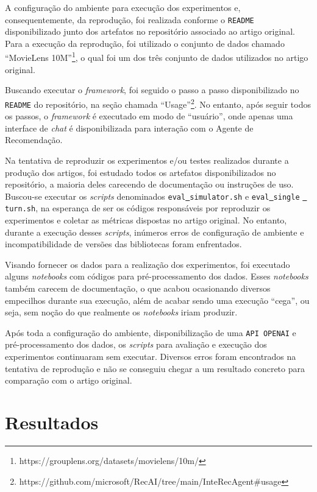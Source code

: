 \documentclass{article}
\begin{document}
A configuração do ambiente para execução dos experimentos e, consequentemente, da reprodução, foi realizada conforme o \texttt{README} disponibilizado junto dos artefatos no repositório associado ao artigo original. Para a execução da reprodução, foi utilizado o conjunto de dados chamado “MovieLens 10M”\footnote{https://grouplens.org/datasets/movielens/10m/}, o qual foi um dos três conjunto de dados utilizados no artigo original. 

Buscando executar o \textit{framework}, foi seguido o passo a passo disponibilizado no \texttt{README} do repositório, na seção chamada “Usage”\footnote{https://github.com/microsoft/RecAI/tree/main/InteRecAgent\#usage}. No entanto, após seguir todos os passos, o \textit{framework} é executado em modo de “usuário”, onde apenas uma interface de \textit{chat} é disponibilizada para interação com o Agente de Recomendação. 

Na tentativa de reproduzir os experimentos e/ou testes realizados durante a produção dos artigos, foi estudado todos os artefatos disponibilizados no repositório, a maioria deles carecendo de documentação ou instruções de uso. Buscou-se executar os \textit{scripts} denominados \texttt{eval\underline{ }simulator.sh} e \texttt{eval\underline{ }single} \texttt{\underline{ }turn.sh}, na esperança de ser os códigos responsáveis por reproduzir os experimentos e coletar as métricas dispostas no artigo original. No entanto, durante a execução desses \textit{scripts}, inúmeros erros de configuração de ambiente e incompatibilidade de versões das bibliotecas foram enfrentados.

Visando fornecer os dados para a realização dos experimentos, foi executado alguns \textit{notebooks} com códigos para pré-processamento dos dados. Esses \textit{notebooks} também carecem de documentação, o que acabou ocasionando diversos empecilhos durante sua execução, além de acabar sendo uma execução “cega”, ou seja, sem noção do que realmente os \textit{notebooks} iriam produzir.

Após toda a configuração do ambiente, disponibilização de uma \texttt{API OPENAI} e pré-processamento dos dados, os \textit{scripts} para avaliação e execução dos experimentos continuaram sem executar. Diversos erros foram encontrados na tentativa de reprodução e não se conseguiu chegar a um resultado concreto para comparação com o artigo original.

\section{Resultados}
\end{document}
